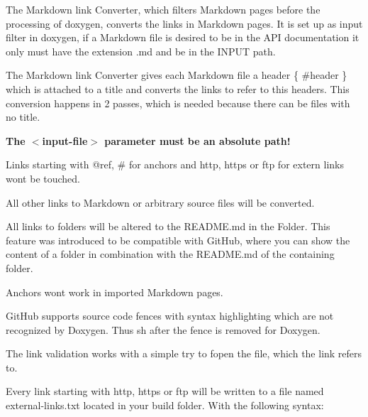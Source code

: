 The Markdown link Converter, which filters Markdown pages before the processing of doxygen, converts the links in Markdown pages. It is set up as input filter in doxygen, if a Markdown file is desired to be in the A\+PI documentation it only must have the extension {\ttfamily .md} and be in the {\ttfamily I\+N\+P\+UT} path.

The Markdown link Converter gives each Markdown file a header {\ttfamily \{ \#header \}} which is attached to a title and converts the links to refer to this headers. This conversion happens in 2 passes, which is needed because there can be files with no title.


\begin{DoxyCode}{0}
\end{DoxyCode}


{\bfseries{The $<$input-\/file$>$ parameter must be an absolute path!}}


\begin{DoxyItemize}
\item Links starting with {\ttfamily @ref}, {\ttfamily \#} for anchors and {\ttfamily http}, {\ttfamily https} or {\ttfamily ftp} for extern links wont be touched.
\item All other links to Markdown or arbitrary source files will be converted.
\item All links to folders will be altered to the R\+E\+A\+D\+M\+E.\+md in the Folder. This feature was introduced to be compatible with Git\+Hub, where you can show the content of a folder in combination with the R\+E\+A\+D\+M\+E.\+md of the containing folder.
\item Anchors wont work in imported Markdown pages.
\end{DoxyItemize}


\begin{DoxyItemize}
\item Git\+Hub supports source code fences with syntax highlighting which are not recognized by Doxygen. Thus {\ttfamily sh} after the fence is removed for Doxygen.
\end{DoxyItemize}

The link validation works with a simple try to {\ttfamily fopen} the file, which the link refers to.

Every link starting with {\ttfamily http}, {\ttfamily https} or {\ttfamily ftp} will be written to a file named {\ttfamily external-\/links.\+txt} located in your build folder. With the following syntax\+:


